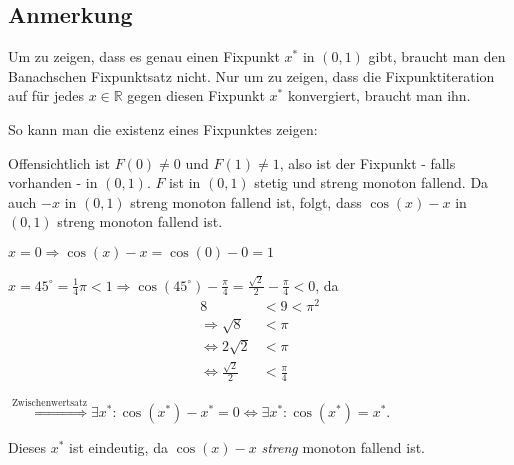\subsection*{Anmerkung}
Um zu zeigen, dass es genau einen Fixpunkt $x^*$ in $(0,1)$ gibt,
braucht man den Banachschen Fixpunktsatz nicht. Nur um zu zeigen,
dass die Fixpunktiteration auf für jedes $x \in \mathbb{R}$ gegen
diesen Fixpunkt $x^*$ konvergiert, braucht man ihn.

So kann man die existenz eines Fixpunktes zeigen:

Offensichtlich ist $F(0) \neq 0$ und $F(1) \neq 1$, also ist der
Fixpunkt - falls vorhanden - in $(0,1)$. $F$ ist in $(0,1)$ stetig
und streng monoton fallend. Da auch $-x$ in $(0,1)$ streng monoton
fallend ist, folgt, dass $\cos(x) - x$ in $(0,1)$ streng monoton
fallend ist.

$x=0 \Rightarrow \cos(x) - x = \cos(0) - 0 = 1$

$x=45^\circ = \frac{1}{4} \pi < 1 \Rightarrow \cos(45^\circ) - \frac{\pi}{4} = \frac{\sqrt{2}}{2} - \frac{\pi}{4} <0$, da
\begin{align}
    8 &< 9 < \pi^2\\
    \Rightarrow \sqrt{8} &< \pi\\
    \Leftrightarrow 2 \sqrt{2} &< \pi\\
    \Leftrightarrow \frac{\sqrt{2}}{2} &< \frac{\pi}{4}
\end{align}

$\stackrel{\text{Zwischenwertsatz}}{\Rightarrow} \exists x^*: \cos(x^*) - x^* = 0 \Leftrightarrow \exists x^*: \cos(x^*) = x^*$.

Dieses $x^*$ ist eindeutig, da $\cos(x)-x$ \emph{streng} monoton fallend ist.
